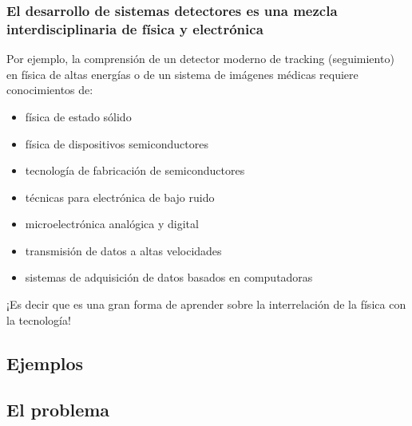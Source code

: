 \documentclass{beamer}
\begin{document}
\begin{frame}
\frametitle{\small{El desarrollo de sistemas detectores es una mezcla interdisciplinaria de f\'isica y electr\'onica}}
{
\small{Por ejemplo, la comprensi\'on de un detector moderno de tracking
(seguimiento) en f\'isica de altas energ\'ias o de un sistema de im\'agenes m\'edicas
requiere conocimientos de:}
\begin{itemize}
\item f\'isica de estado s\'olido
\item f\'isica de dispositivos semiconductores
\item tecnolog\'ia de fabricaci\'on de semiconductores
\item t\'ecnicas para electr\'onica de bajo ruido
\item microelectr\'onica anal\'ogica y digital
\item transmisi\'on de datos a altas velocidades
\item sistemas de adquisici\'on de datos basados en computadoras
\end{itemize}
}
\begin{exampleblock}{}
\small{¡Es decir que es una gran forma de aprender sobre la interrelaci\'on de la
\alert{f\'isica} con la \alert{tecnolog\'ia}!}
\end{exampleblock}
\end{frame}

\subsection{Ejemplos}

\subsection{El problema}
\end{document}
